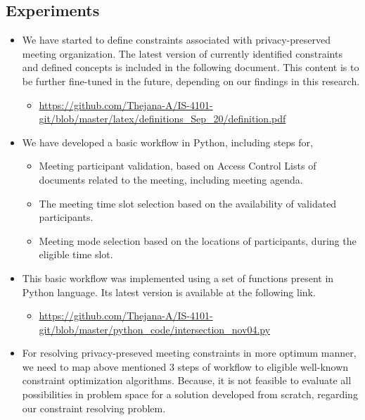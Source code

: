 \begin{spacing}{1.0}
    \subsection{Experiments}
        \begin{itemize}
            \item We have started to define constraints associated with privacy-preserved meeting organization. The latest version of currently identified constraints and defined concepts is included in the following document. This content is to be further fine-tuned in the future, depending on our findings in this research. 
                \begin{itemize}
                    \item \url{https://github.com/Thejana-A/IS-4101-git/blob/master/latex/definitions_Sep_20/definition.pdf} 
                \end{itemize}
            \item We have developed a basic workflow in Python, including steps for,
                \begin{itemize}
                    \item Meeting participant validation, based on Access Control Lists of documents related to the meeting, including meeting agenda. 
                    \item The meeting time slot selection based on the availability of validated participants.
                    \item Meeting mode selection based on the locations of participants, during the eligible time slot.
                \end{itemize}
            \item This basic workflow was implemented using a set of functions present in Python language. Its latest version is available at the following link.
                \begin{itemize}
                    \item \url{https://github.com/Thejana-A/IS-4101-git/blob/master/python_code/intersection_nov04.py } 
                \end{itemize}
            \item For resolving privacy-preseved meeting constraints in more optimum manner, we need to map above mentioned 3 steps of workflow to eligible well-known constraint optimization algorithms. Because, it is not feasible to evaluate all possibilities in problem space for a solution developed from scratch, regarding our constraint resolving problem.

\end{itemize}
\end{spacing}
